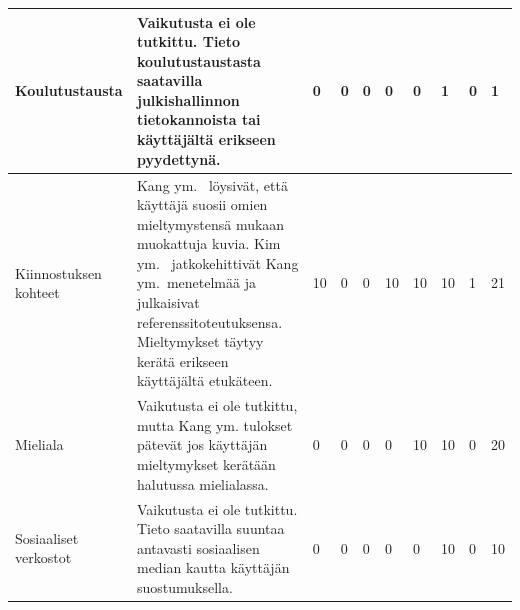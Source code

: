 \documentclass[finnish, 12pt, a4paper, elec, utf8, a-1b, online]{aaltothesis}
\begin{document}
{\begin{longtable}{p{2.5cm}|p{6cm}|p{0.5cm}p{0.5cm}p{0.5cm}|p{0.5cm}|p{0.5cm}p{0.5cm}p{0.5cm}|p{0.5cm}|}
    \midrule
    Koulutustausta                         & Vaikutusta ei ole tutkittu. Tieto koulutustaustasta saatavilla julkishallinnon tietokannoista tai käyttäjältä erikseen pyydettynä.                                                                                                                                                                                                                                    & 0                                          & 0                                   & 0                                      & 0                            & 0                                               & 1                                         & 0                                         & 1                            \\
    \midrule
    Kiinnostuksen kohteet                  & Kang ym.~\cite{5539850} löysivät, että käyttäjä suosii omien mieltymystensä mukaan muokattuja kuvia. Kim ym.~\cite{10.1007/978-3-030-58577-8_23} jatkokehittivät Kang ym.~menetelmää ja julkaisivat referenssitoteutuksensa. Mieltymykset täytyy kerätä erikseen käyttäjältä etukäteen.                                                                               & 10                                         & 0                                   & 0                                      & 10                           & 10                                              & 10                                        & 1                                         & 21                           \\
    \midrule
    Mieliala                               & Vaikutusta ei ole tutkittu, mutta Kang ym.\cite{5539850} tulokset pätevät jos käyttäjän mieltymykset kerätään halutussa mielialassa.                                                                                                                                                                                                                                  & 0                                          & 0                                   & 0                                      & 0                            & 10                                              & 10                                        & 0                                         & 20                           \\
    \midrule
    Sosiaaliset verkostot                  & Vaikutusta ei ole tutkittu. Tieto saatavilla suuntaa antavasti sosiaalisen median kautta käyttäjän suostumuksella.                                                                                                                                                                                                                                                    & 0                                          & 0                                   & 0                                      & 0                            & 0                                               & 10                                        & 0                                         & 10                           \\

\end{longtable}}
\end{document}
